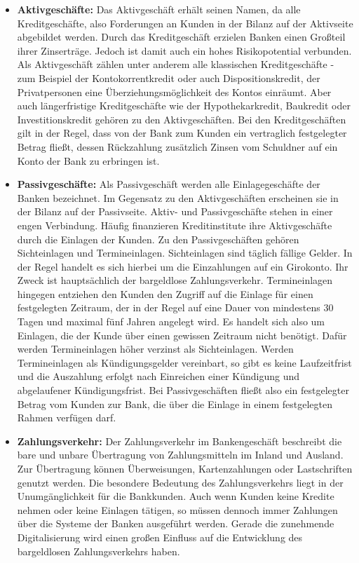 \documentclass[12pt,oneside,a4paper,parskip]{scrbook}
\begin{document}
\begin{itemize}
  \item \textbf{Aktivgeschäfte:} Das Aktivgeschäft erhält seinen Namen, da alle Kreditgeschäfte, also Forderungen an Kunden in der Bilanz auf der Aktivseite abgebildet werden. Durch das Kreditgeschäft erzielen Banken einen Großteil ihrer Zinserträge. Jedoch ist damit auch ein hohes Risikopotential verbunden. Als Aktivgeschäft zählen unter anderem alle klassischen Kreditgeschäfte
  - zum Beispiel der Kontokorrentkredit oder auch Dispositionskredit, der Privatpersonen eine Überziehungsmöglichkeit des Kontos einräumt. Aber auch längerfristige Kreditgeschäfte wie der Hypothekarkredit, Baukredit oder Investitionskredit gehören zu den Aktivgeschäften. Bei den Kreditgeschäften gilt in der Regel, dass von der Bank zum Kunden ein vertraglich festgelegter Betrag fließt, dessen Rückzahlung zusätzlich Zinsen vom Schuldner auf ein Konto der Bank zu erbringen ist.
  \item \textbf{Passivgeschäfte:} Als Passivgeschäft werden alle Einlagegeschäfte der Banken bezeichnet. Im Gegensatz zu den Aktivgeschäften erscheinen sie in der Bilanz auf der Passivseite. Aktiv- und Passivgeschäfte stehen in einer engen Verbindung. Häufig finanzieren Kreditinstitute ihre Aktivgeschäfte durch die Einlagen der Kunden. Zu den Passivgeschäften gehören Sichteinlagen und Termineinlagen. Sichteinlagen sind täglich fällige Gelder. In der Regel handelt es sich hierbei um die Einzahlungen auf ein Girokonto. Ihr Zweck ist hauptsächlich der bargeldlose Zahlungsverkehr. Termineinlagen hingegen entziehen den Kunden den Zugriff auf die Einlage für einen festgelegten Zeitraum, der in der Regel auf eine Dauer von mindestens 30 Tagen und maximal fünf Jahren angelegt wird. Es handelt sich also um Einlagen, die der Kunde über einen gewissen Zeitraum nicht benötigt. Dafür werden Termineinlagen höher verzinst als Sichteinlagen. Werden Termineinlagen als Kündigungsgelder vereinbart, so gibt es keine Laufzeitfrist und die Auszahlung erfolgt nach Einreichen einer Kündigung und abgelaufener Kündigungsfrist. Bei Passivgeschäften fließt also ein festgelegter Betrag vom Kunden zur Bank, die über die Einlage in einem festgelegten Rahmen verfügen darf.
  \item \textbf{Zahlungsverkehr:} Der Zahlungsverkehr im Bankengeschäft beschreibt die bare und unbare Übertragung von Zahlungsmitteln im Inland und Ausland. Zur Übertragung können Überweisungen, Kartenzahlungen oder Lastschriften genutzt werden. Die besondere Bedeutung des Zahlungsverkehrs liegt in der Un\-um\-gäng\-lich\-keit für die Bankkunden. Auch wenn Kunden keine Kredite nehmen oder keine Einlagen tätigen, so müssen dennoch immer Zahlungen über die Systeme der Banken ausgeführt werden. Gerade die zunehmende Digitalisierung wird einen großen Einfluss auf die Entwicklung des bargeldlosen Zahlungsverkehrs haben. 
\end{itemize}
\end{document}
